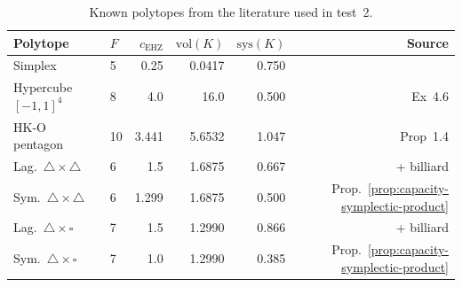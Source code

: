\begin{table}[h]
\centering
\small
\begin{tabular}{llrrrr}
\toprule
Polytope & $F$ & $c_{\mathrm{EHZ}}$ & $\mathrm{vol}(K)$ & $\mathrm{sys}(K)$ & Source \\
\midrule
Simplex & 5 & 0.25 & 0.0417 & 0.750 & \cite{Nir2013} \\
Hypercube $[-1,1]^4$ & 8 & 4.0 & 16.0 & 0.500 & \cite{HK2019} Ex~4.6 \\
HK-O pentagon & 10 & 3.441 & 5.6532 & 1.047 & \cite{HaimKislevOstrover2024} Prop~1.4 \\
Lag.\ $\triangle \times \triangle$ & 6 & 1.5 & 1.6875 & 0.667 & \cite{HK2017} + billiard \\
Sym.\ $\triangle \times \triangle$ & 6 & 1.299 & 1.6875 & 0.500 & Prop.~\ref{prop:capacity-symplectic-product} \\
Lag.\ $\triangle \times \square$ & 7 & 1.5 & 1.2990 & 0.866 & \cite{HK2017} + billiard \\
Sym.\ $\triangle \times \square$ & 7 & 1.0 & 1.2990 & 0.385 & Prop.~\ref{prop:capacity-symplectic-product} \\
\bottomrule
\end{tabular}
\caption{Known polytopes from the literature used in test~2.}
\label{tab:literature-polytopes}
\end{table}

